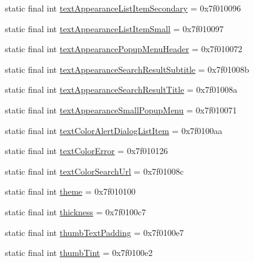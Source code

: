 \begin{CompactItemize}
\item 
static final int \hyperlink{classandroid_1_1support_1_1v7_1_1cardview_1_1_r_1_1attr_f5f3563881936413a812ef4bc33a2692}{textAppearanceListItemSecondary} = 0x7f010096
\item 
static final int \hyperlink{classandroid_1_1support_1_1v7_1_1cardview_1_1_r_1_1attr_869a82d546e160f677fc9aff5ba47000}{textAppearanceListItemSmall} = 0x7f010097
\item 
static final int \hyperlink{classandroid_1_1support_1_1v7_1_1cardview_1_1_r_1_1attr_49ddd6f1d69ed2611f9289e6414946ae}{textAppearancePopupMenuHeader} = 0x7f010072
\item 
static final int \hyperlink{classandroid_1_1support_1_1v7_1_1cardview_1_1_r_1_1attr_42db1341678888a5546b31c22da35ec8}{textAppearanceSearchResultSubtitle} = 0x7f01008b
\item 
static final int \hyperlink{classandroid_1_1support_1_1v7_1_1cardview_1_1_r_1_1attr_8b62fa9c9c85c5401446dd020fcd1e97}{textAppearanceSearchResultTitle} = 0x7f01008a
\item 
static final int \hyperlink{classandroid_1_1support_1_1v7_1_1cardview_1_1_r_1_1attr_dfdd2f44599032bac981e62f139be188}{textAppearanceSmallPopupMenu} = 0x7f010071
\item 
static final int \hyperlink{classandroid_1_1support_1_1v7_1_1cardview_1_1_r_1_1attr_4e3137ce7f13800c101ba42e647c1a20}{textColorAlertDialogListItem} = 0x7f0100aa
\item 
static final int \hyperlink{classandroid_1_1support_1_1v7_1_1cardview_1_1_r_1_1attr_b2f9130d3f5c81f6a03f27ae693c86d4}{textColorError} = 0x7f010126
\item 
static final int \hyperlink{classandroid_1_1support_1_1v7_1_1cardview_1_1_r_1_1attr_dd00aa364d815766f3bfa412d4a23b5e}{textColorSearchUrl} = 0x7f01008c
\item 
static final int \hyperlink{classandroid_1_1support_1_1v7_1_1cardview_1_1_r_1_1attr_24bcabf15e41a5e3c118342889da52c1}{theme} = 0x7f010100
\item 
static final int \hyperlink{classandroid_1_1support_1_1v7_1_1cardview_1_1_r_1_1attr_6ff38ec7bbb4e0f8e0c8d053f7224b53}{thickness} = 0x7f0100c7
\item 
static final int \hyperlink{classandroid_1_1support_1_1v7_1_1cardview_1_1_r_1_1attr_a8eafa89662c598222b5bc2bcf02112e}{thumbTextPadding} = 0x7f0100e7
\item 
static final int \hyperlink{classandroid_1_1support_1_1v7_1_1cardview_1_1_r_1_1attr_b423e0a38f6e42633de575fad529148c}{thumbTint} = 0x7f0100e2

\end{CompactItemize}
